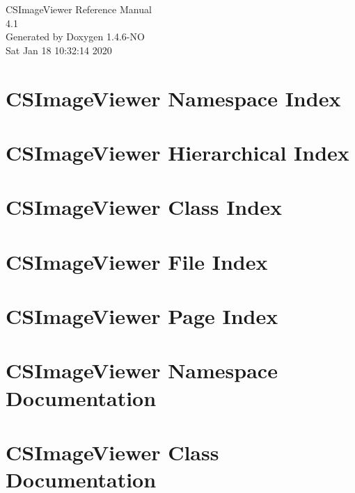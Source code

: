 \documentclass[a4paper]{book}
\begin{document}
\begin{titlepage}
\vspace*{7cm}
\begin{center}
{\Large CSImage\-Viewer Reference Manual\\[1ex]\large 4.1 }\\
\vspace*{1cm}
{\large Generated by Doxygen 1.4.6-NO}\\
\vspace*{0.5cm}
{\small Sat Jan 18 10:32:14 2020}\\
\end{center}
\end{titlepage}
\clearemptydoublepage
{}
\tableofcontents
\clearemptydoublepage
{}
\chapter{CSImage\-Viewer Namespace Index}

\chapter{CSImage\-Viewer Hierarchical Index}

\chapter{CSImage\-Viewer Class Index}

\chapter{CSImage\-Viewer File Index}

\chapter{CSImage\-Viewer Page Index}

\chapter{CSImage\-Viewer Namespace Documentation}









\chapter{CSImage\-Viewer Class Documentation}








\end{document}
